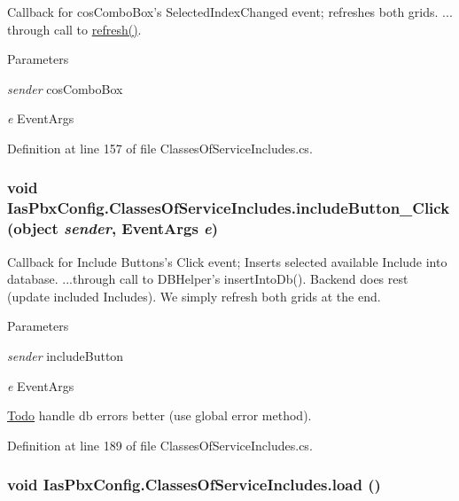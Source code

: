 Callback for cosComboBox's SelectedIndexChanged event; refreshes both grids. ... through call to \hyperlink{class_ias_pbx_config_1_1_classes_of_service_includes_a67961a306356b33f1533714abb1008e1}{refresh()}. 
\begin{DoxyParams}{Parameters}
\item[{\em sender}]cosComboBox \item[{\em e}]EventArgs \end{DoxyParams}


Definition at line 157 of file ClassesOfServiceIncludes.cs.\hypertarget{class_ias_pbx_config_1_1_classes_of_service_includes_a4288e7154a66a346e90956e347431c53}{
\subsubsection[{includeButton\_\-Click}]{\setlength{\rightskip}{0pt plus 5cm}void IasPbxConfig.ClassesOfServiceIncludes.includeButton\_\-Click (object {\em sender}, \/  EventArgs {\em e})}}
\label{class_ias_pbx_config_1_1_classes_of_service_includes_a4288e7154a66a346e90956e347431c53}


Callback for Include Buttons's Click event; Inserts selected available Include into database. ...through call to DBHelper's insertIntoDb(). Backend does rest (update included Includes). We simply refresh both grids at the end. 
\begin{DoxyParams}{Parameters}
\item[{\em sender}]includeButton \item[{\em e}]EventArgs \end{DoxyParams}
\begin{Desc}
\item[\hyperlink{todo__todo000012}{Todo}]handle db errors better (use global error method). \end{Desc}


Definition at line 189 of file ClassesOfServiceIncludes.cs.\hypertarget{class_ias_pbx_config_1_1_classes_of_service_includes_afba25c0ca7c6b26bcd5e8b6984758908}{
\subsubsection[{load}]{\setlength{\rightskip}{0pt plus 5cm}void IasPbxConfig.ClassesOfServiceIncludes.load ()}}
\label{class_ias_pbx_config_1_1_classes_of_service_includes_afba25c0ca7c6b26bcd5e8b6984758908}


